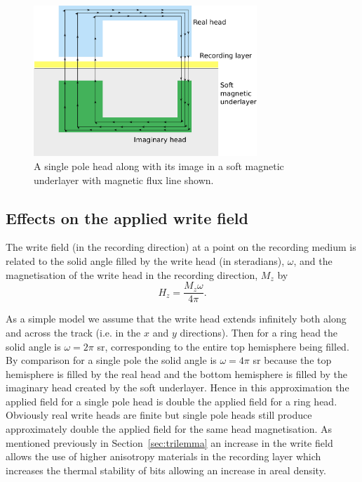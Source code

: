\begin{figure}[!ht]
  \center
  \includegraphics[width=0.75\textwidth]{./images/SPH_images}
  \caption{A single pole head along with its image in a soft magnetic underlayer
    with magnetic flux line shown.\label{fig:imaginary_head}}
\end{figure}


\subsection{Effects on the applied write field}

The write field (in the recording direction) at a point on the recording medium
is related to the solid angle filled by the write head (in steradians),
$\omega$, and the magnetisation of the write head in the recording direction,
$M_{z}$ by\cite{Richter2007a}
\[ H_{z}=\dfrac{M_{z} \omega}{4\pi}.\]

As a simple model we assume that the write head extends infinitely both along
and across the track (i.e. in the $x$ and $y$ directions). Then for a ring head
the solid angle is $\omega=2\pi$ sr, corresponding to the entire top hemisphere
being filled. By comparison for a single pole the solid angle is $\omega=4\pi$
sr because the top hemisphere is filled by the real head and the bottom
hemisphere is filled by the imaginary head created by the soft underlayer. Hence
in this approximation the applied field for a single pole head is double the
applied field for a ring head. Obviously real write heads are finite but single
pole heads still produce approximately double the applied field for the same
head magnetisation.\cite{Khizroev2004a} As mentioned previously in
Section~\ref{sec:trilemma} an increase in the write field allows the use of
higher anisotropy materials in the recording layer which increases the thermal
stability of bits allowing an increase in areal density.


